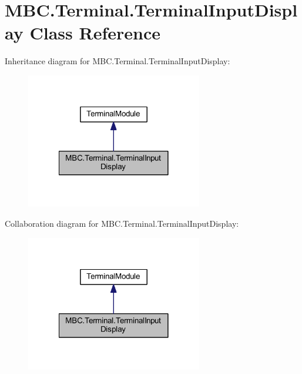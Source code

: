 \hypertarget{class_m_b_c_1_1_terminal_1_1_terminal_input_display}{\section{M\-B\-C.\-Terminal.\-Terminal\-Input\-Display Class Reference}
\label{class_m_b_c_1_1_terminal_1_1_terminal_input_display}
}


Inheritance diagram for M\-B\-C.\-Terminal.\-Terminal\-Input\-Display\-:
\nopagebreak
\begin{figure}[H]
\begin{center}
\leavevmode
\includegraphics[width=218pt]{class_m_b_c_1_1_terminal_1_1_terminal_input_display__inherit__graph}
\end{center}
\end{figure}


Collaboration diagram for M\-B\-C.\-Terminal.\-Terminal\-Input\-Display\-:
\nopagebreak
\begin{figure}[H]
\begin{center}
\leavevmode
\includegraphics[width=218pt]{class_m_b_c_1_1_terminal_1_1_terminal_input_display__coll__graph}
\end{center}
\end{figure}
